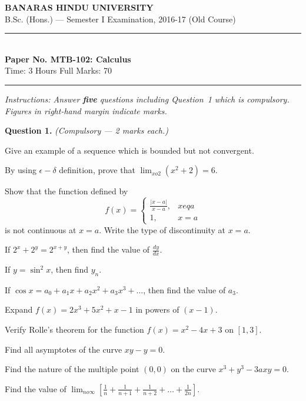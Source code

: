 \documentclass[11pt,a4paper]{article}
\begin{document}
\begin{center}
  {\large\bfseries BANARAS HINDU UNIVERSITY}\\[2pt]
  {\normalsize B.Sc. (Hons.) --- Semester I Examination, 2016-17 (Old Course)}\\[6pt]
  \rule{0.8\linewidth}{0.5pt}\\[6pt]
  {\large\bfseries Paper No. MTB-102: Calculus}\\[4pt]
  {\normalsize Time: 3 Hours \hfill Full Marks: 70}
\end{center}
\rule{\linewidth}{0.4pt}
\smallskip



\noindent   \textit{Instructions: Answer   \textbf{five} questions including Question~1 which is compulsory. Figures in right-hand margin indicate marks.}
\bigskip




\noindent   \textbf{Question 1.}   \textit{(Compulsory --- 2 marks each.)}

\begin{parts}
  \item Give an example of a sequence which is bounded but not convergent.
  \item By using $\epsilon - \delta$ definition, prove that $\lim_{x o 2} (x^2 + 2) = 6$.
  \item Show that the function defined by
  \[
  f(x) = 
\begin{cases} \frac{|x-a|}{x-a}, & x 
eq a \\ 1, & x = a \end{cases}
  \]
  is not continuous at $x = a$. Write the type of discontinuity at $x = a$.
  \item If $2^x + 2^y = 2^{x+y}$, then find the value of $\frac{dy}{dx}$.
  \item If $y = \sin^2 x$, then find $y_n$.
  \item If $\cos x = a_0 + a_1 x + a_2 x^2 + a_3 x^3 + \dots$, then find the value of $a_3$.
  \item Expand $f(x) = 2x^3 + 5x^2 + x - 1$ in powers of $(x - 1)$.
  \item Verify Rolle's theorem for the function $f(x) = x^2 - 4x + 3$ on $[1,3]$.
  \item Find all asymptotes of the curve $xy - y = 0$.
  \item Find the nature of the multiple point $(0, 0)$ on the curve $x^3 + y^3 - 3axy = 0$.
  \item Find the value of $\lim_{n o\infty} \left[ \frac{1}{n} + \frac{1}{n+1} + \frac{1}{n+2} + \dots + \frac{1}{2n} \right]$.
\end{parts}
\end{document}
